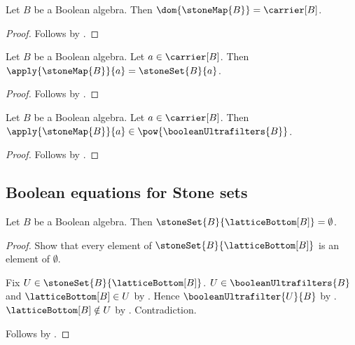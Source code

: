 \begin{proposition}\label{stone_map_domain}
    Let $B$ be a Boolean algebra.
    Then $\dom{\stoneMap{B}}=\carrier[B]$.
\end{proposition}
\begin{proof}
    Follows by .
\end{proof}

\begin{proposition}\label{stone_map_apply}
    Let $B$ be a Boolean algebra.
    Let $a\in\carrier[B]$.
    Then $\apply{\stoneMap{B}}{a}=\stoneSet{B}{a}$.
\end{proposition}
\begin{proof}
    Follows by
        .
\end{proof}

\begin{proposition}\label{stone_map_apply_type}
    Let $B$ be a Boolean algebra.
    Let $a\in\carrier[B]$.
    Then $\apply{\stoneMap{B}}{a}\in\pow{\booleanUltrafilters{B}}$.
\end{proposition}
\begin{proof}
    Follows by .
\end{proof}

\subsection{Boolean equations for Stone sets}

\begin{proposition}\label{stone_set_lattice_bottom}
    Let $B$ be a Boolean algebra.
    Then $\stoneSet{B}{\latticeBottom[B]}=\emptyset$.
\end{proposition}
\begin{proof}
    Show that every element of
        $\stoneSet{B}{\latticeBottom[B]}$ is an element of $\emptyset$.
    \begin{subproof}
        Fix $U\in\stoneSet{B}{\latticeBottom[B]}$.
        $U\in\booleanUltrafilters{B}$ and
            $\latticeBottom[B]\in U$ by .
        Hence $\booleanUltrafilter{U}{B}$ by
            .
        $\latticeBottom[B]\notin U$ by
            .
        Contradiction.
    \end{subproof}
    Follows by .
\end{proof}

